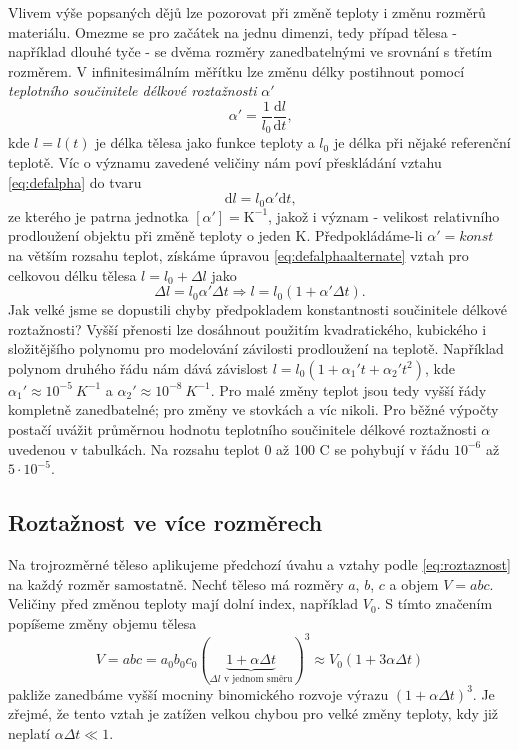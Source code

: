 \documentclass[a4paper,12pt]{article}   %
\newcommand{\dif}{\text{d}}
\begin{document}
Vlivem výše popsaných dějů lze pozorovat při změně teploty i změnu rozměrů materiálu. Omezme se pro začátek na jednu dimenzi, tedy případ tělesa - například dlouhé tyče - se dvěma rozměry zanedbatelnými ve srovnání s třetím rozměrem. V infinitesimálním měřítku lze změnu délky postihnout pomocí \textit{teplotního součinitele délkové roztažnosti} $\alpha'$
\begin{equation}
  \label{eq:defalpha}
  \alpha' = \frac{1}{l_0} \frac{\dif l}{\dif t}\text{,}
\end{equation}
kde $l = l(t)$ je délka tělesa jako funkce teploty a $l_0$ je délka při nějaké referenční teplotě. Víc o významu zavedené veličiny nám poví přeskládání vztahu \eqref{eq:defalpha} do tvaru
\begin{equation}
  \dif l = l_0 \alpha' \dif t \text{,}
  \label{eq:defalphaalternate}
\end{equation}
ze kterého je patrna jednotka $[\alpha '] = \text{K}^{-1}$, jakož i význam - velikost relativního prodloužení objektu při změně teploty o jeden K. Předpokládáme-li $\alpha' = konst$ na větším rozsahu teplot, získáme úpravou \eqref{eq:defalphaalternate} vztah pro celkovou délku tělesa $l = l_0 + \Delta l$ jako
\begin{equation}
  \label{eq:roztaznost}
  \Delta l = l_0 \alpha' \Delta t \Longrightarrow l = l_0(1 + \alpha' \Delta t)\text{.}
\end{equation}
Jak velké jsme se dopustili chyby předpokladem konstantnosti součinitele délkové roztažnosti? Vyšší přenosti lze dosáhnout použitím kvadratického, kubického i složitějšího polynomu pro modelování závilosti prodloužení na teplotě. Například polynom druhého řádu nám dává závislost $ l = l_0 (1+\alpha_1't + \alpha_2't^2)$, kde $\alpha_1' \approx 10^{-5}~K^{-1}$ a $\alpha_2' \approx 10^{-8}~K^{-1}$. Pro malé změny teplot jsou tedy vyšší řády kompletně zanedbatelné; pro změny ve stovkách a víc nikoli. Pro běžné výpočty postačí uvážit průměrnou hodnotu teplotního součinitele délkové roztažnosti $\alpha$ uvedenou v tabulkách. Na rozsahu teplot 0 až 100 \degree C se pohybují v řádu $10^{-6}$ až $5 \cdot 10^{-5}$.

\subsection{Roztažnost ve více rozměrech}
Na trojrozměrné těleso aplikujeme předchozí úvahu a vztahy podle \eqref{eq:roztaznost} na každý rozměr samostatně. Nechť těleso má rozměry $a$, $b$, $c$ a objem $V = abc$. Veličiny před změnou teploty mají dolní index, například $V_0$. S tímto značením popíšeme změny objemu tělesa
\begin{equation}
  V = abc = a_0 b_0 c_0 (\underbrace{1+\alpha \Delta t}_{\Delta l \text{ v jednom směru}})^3 \approx V_0 (1 + 3\alpha \Delta t)
\end{equation}
pakliže zanedbáme vyšší mocniny binomického rozvoje výrazu $(1 + \alpha \Delta t)^3$. Je zřejmé, že tento vztah je zatížen velkou chybou pro velké změny teploty, kdy již neplatí $\alpha \Delta t \ll 1$.
\end{document}

